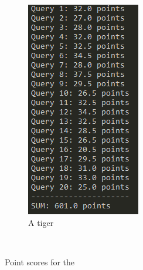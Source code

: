 \begin{figure}[h]
    \qquad
    \begin{subfigure}[b]{0.3\textwidth}
        \includegraphics[width=\textwidth]{fig/results_dumb.PNG}
        \caption{A tiger}
        \label{fig:tiger}
    \end{subfigure}
    ~ %

    \caption{Point scores for the }\label{fig:offline_test_results}
\end{figure}


\cleardoublepage